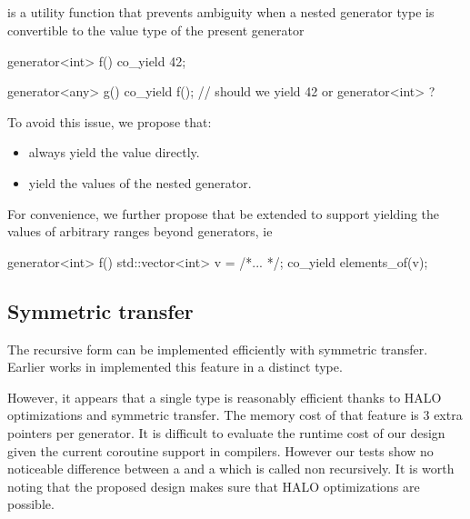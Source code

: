 \documentclass{wg21}
\begin{document}
\subsection{}

 is a utility function that prevents ambiguity when a nested generator type is convertible to the value type
of the present generator

\begin{colorblock}
    generator<int> f()
    {
        co_yield 42;
    }
    
    generator<any> g()
    {
        co_yield f(); // should we yield 42 or generator<int> ?
    }
    
\end{colorblock}

To avoid this issue, we propose that:

\begin{itemize}
    \item {} always yield the value directly.
    \item {} yield the values of the nested generator.
\end{itemize}


For convenience, we further propose that  be extended to support
yielding the values of arbitrary ranges beyond generators, ie 

\begin{colorblock}
    generator<int> f()
    {
        std::vector<int> v = /*... */;
        co_yield elements_of(v);
    }
    
\end{colorblock}

\subsection{Symmetric transfer}

The recursive form can be implemented efficiently with symmetric transfer.
Earlier works in \cite{CppCoro} implemented this feature in a distinct  type.

However, it appears that a single type is reasonably efficient thanks to HALO optimizations and symmetric transfer.
The memory cost of that feature is 3 extra pointers per generator.
It is difficult to evaluate the runtime cost of our design given the current coroutine support in compilers.
However our tests show no noticeable difference between a  and a  
which is called non recursively. It is worth noting that the proposed design makes sure that HALO \cite{P0981R0} optimizations are possible.
\end{document}
